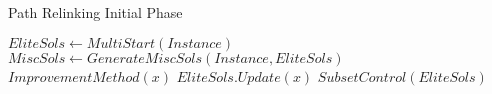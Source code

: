 \begin{algorithm}
  \caption{Path Relinking Initial Phase}\label{pr_init}
  \begin{algorithmic}[0]
    \State $EliteSols \gets MultiStart(Instance)$
    \Repeat
    \State $MiscSols \gets GenerateMiscSols(Instance,EliteSols)$
    \State $ImprovementMethod(x)$
    \State $EliteSols.Update(x)$
    \EndFor
    \State $SubsetControl(EliteSols)$
    \EndProcedure
  \end{algorithmic}
\end{algorithm}
